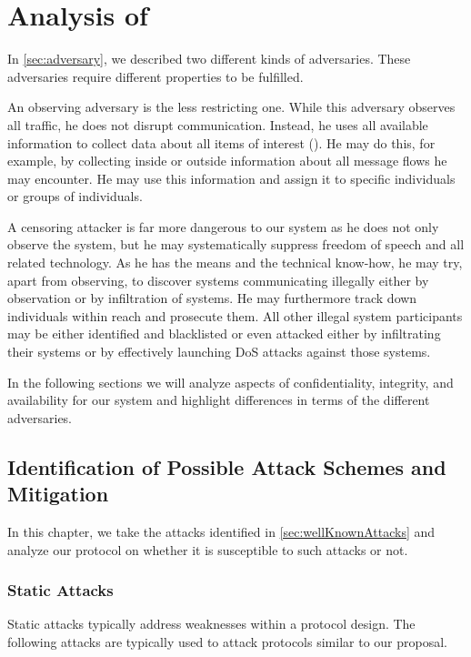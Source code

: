 \part{Analysis of \MessageVortex}\label{sec:analysis}
In \cref{sec:adversary}, we described two different kinds of adversaries. These adversaries require different properties to be fulfilled. 

An observing adversary is the less restricting one. While this adversary observes all traffic, he does not disrupt communication. Instead, he uses all available information to collect data about all items of interest (). He may do this, for example, by collecting inside or outside information about all message flows he may encounter. He may use this information and assign it to specific individuals or groups of individuals.

A censoring attacker is far more dangerous to our system as he does not only observe the system, but he may systematically suppress freedom of speech and all related technology. As he has the means and the technical know-how, he may try, apart from observing, to discover systems communicating illegally either by observation or by infiltration of systems. He may furthermore track down individuals within reach and prosecute them. All other illegal system participants may be either identified and blacklisted or even attacked either by infiltrating their systems or by effectively launching DoS attacks against those systems.

In the following sections we will analyze aspects of confidentiality, integrity, and availability for our system and highlight differences in terms of the different adversaries.

\chapter[Identification of Attacks and Mitigations]{Identification of Possible Attack Schemes and Mitigation}\label{sec:attacks}
In this chapter, we take the attacks identified in \cref{sec:wellKnownAttacks} and analyze our protocol on whether it is susceptible to such attacks or not.

\section{Static Attacks}
Static attacks typically address weaknesses within a protocol design. The following attacks are typically used to attack protocols similar to our proposal.

